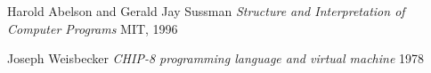 \begin{thebibliography}{XXXXXX}
	\label{chap:bib}

	 Harold Abelson and Gerald Jay Sussman
	\emph{Structure and Interpretation of Computer Programs} MIT, 1996

	 Joseph Weisbecker
	\emph{CHIP-8 programming language and virtual machine} 1978

\end{thebibliography}